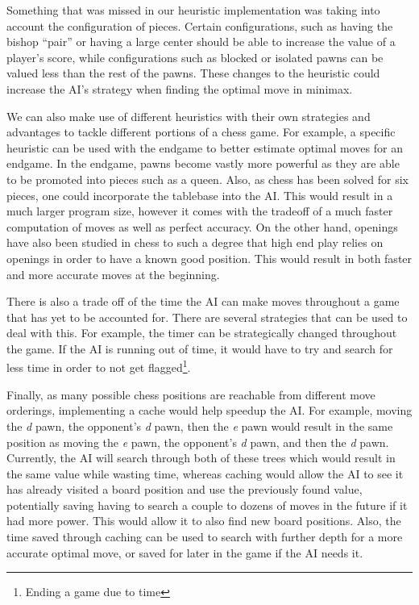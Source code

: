 \documentclass[12pt, letterpaper]{article}
\begin{document}
Something that was missed in our heuristic implementation was taking into account the configuration of pieces.
Certain configurations, such as having the bishop ``pair'' or having a large center should be able to increase
the value of a player's score, while configurations such as blocked or isolated pawns can be valued less than
the rest of the pawns. These changes to the heuristic could increase the AI's strategy when finding the optimal
move in minimax.

\medskip

We can also make use of different heuristics with their own strategies and advantages to tackle different portions
of a chess game. For example, a specific heuristic can be used with the endgame to better estimate optimal moves
for an endgame. In the endgame, pawns become vastly more powerful as they are able to be promoted into pieces
such as a queen. Also, as chess has been solved for six pieces, one could incorporate the tablebase into the AI.
This would result in a much larger program size, however it comes with the tradeoff of a much faster computation
of moves as well as perfect accuracy. On the other hand, openings have also been studied in chess to such a degree
that high end play relies on openings in order to have a known good position. This would result in both faster and
more accurate moves at the beginning.

\medskip

There is also a trade off of the time the AI can make moves throughout a game that has yet to be accounted for.
There are several strategies that can be used to deal with this. For example, the timer can be strategically
changed throughout the game. If the AI is running out of time, it would have to try and search for less time
in order to not get flagged\footnote{Ending a game due to time}.

\medskip

Finally, as many possible chess positions are reachable from different move orderings, implementing a
cache would help speedup the AI. For example, moving the \textit{d} pawn, the opponent's \textit{d} pawn,
then the \textit{e} pawn would result in the same position as moving the \textit{e} pawn, the opponent's
\textit{d} pawn, and then the \textit{d} pawn. Currently, the AI will search through both of these trees
which would result in the same value while wasting time, whereas caching would allow the AI to see it has
already visited a board position and use the previously found value, potentially saving having to search a
couple to dozens of moves in the future if it had more power. This would allow it to also find new board
positions. Also, the time saved through caching can be used to search with further depth for a more accurate
optimal move, or saved for later in the game if the AI needs it.
\end{document}
